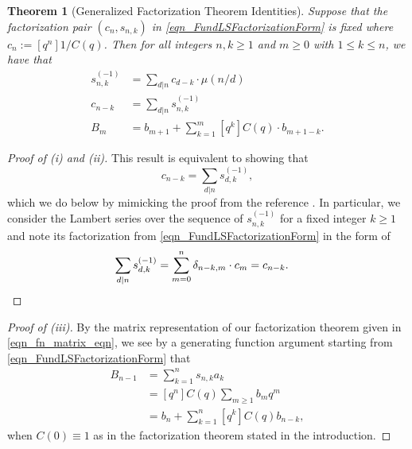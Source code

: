 \documentclass[10pt,reqno]{amsart}
\numberwithin{figure}{section}
\numberwithin{table}{section}
\theoremstyle{plain}
\newtheorem{theorem}{Theorem}
\numberwithin{theorem}{section}
\theoremstyle{remark}
\begin{document}
\begin{theorem}[Generalized Factorization Theorem Identities] 
\label{theorem_MainThm_LSFactProps}
Suppose that the factorization pair $(c_n, s_{n,k})$ in 
\eqref{eqn_FundLSFactorizationForm} is fixed where $c_n := [q^n] 1 / C(q)$. 
Then for all integers $n, k \geq 1$ and $m \geq 0$ with $1 \leq k \leq n$, 
we have that 
\begin{align} 
\tag{i} 
s_{n,k}^{(-1)} & = \sum_{d|n} c_{d-k} \cdot \mu(n / d) \\ 
\tag{ii} 
c_{n-k} & = \sum_{d|n} s_{n,k}^{(-1)} \\ 
\tag{iii} 
B_m & = b_{m+1} + \sum_{k=1}^m [q^k] C(q) \cdot b_{m+1-k}. 
\end{align} 
\end{theorem} 
\begin{proof}[Proof of (i) and (ii)] 
This result is equivalent to showing that 
\[
c_{n-k} = \sum_{d|n} s_{d,k}^{(-1)}, 
\] 
which we do below by mimicking the proof from the reference 
\cite[\S 3]{MERCA-SCHMIDT1}. 
In particular, we consider the Lambert series over the sequence of 
$s_{n,k}^{(-1)}$ for a fixed integer $k \geq 1$ and note its 
factorization from \eqref{eqn_FundLSFactorizationForm} in the form of 
\begin{align*} 
\sum_{d|n} s_{d,k}^{(-1)} & = \sum_{m=0}^n \delta_{n-k,m} \cdot c_m = c_{n-k}. 
     \qedhere
\end{align*} 
\end{proof} 
\begin{proof}[Proof of (iii)] 
By the matrix representation of our factorization theorem given in 
\eqref{eqn_fn_matrix_eqn}, we see by a generating function argument 
starting from \eqref{eqn_FundLSFactorizationForm} that 
\begin{align*} 
B_{n-1} & = \sum_{k=1}^n s_{n,k} a_k \\ 
     & = 
     [q^n] C(q) \sum_{m \geq 1} b_m q^m \\ 
     & = 
     b_n + \sum_{k=1}^n [q^k] C(q) b_{n-k}, 
\end{align*} 
when $C(0) \equiv 1$ as in the factorization theorem stated in the introduction. 
\end{proof} 
\end{document}

